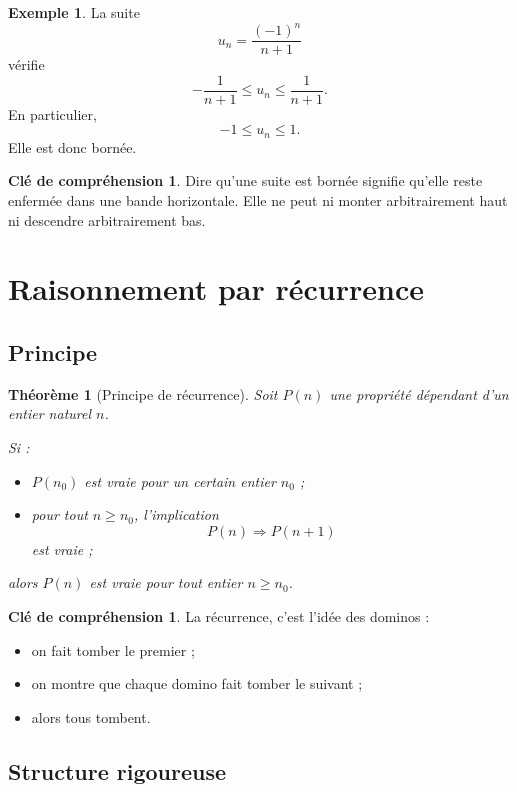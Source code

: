 \documentclass[11pt,a4paper]{article}
\theoremstyle{definition}
\newtheorem{exemple}[definition]{Exemple}
\newtheorem{interpretation}[definition]{Clé de compréhension}
\theoremstyle{plain}
\newtheorem{theoreme}[definition]{Théorème}
\theoremstyle{remark}
\begin{document}
\begin{exemple}
La suite
\[
u_n=\frac{(-1)^n}{n+1}
\]
vérifie
\[
-\frac1{n+1}\leq u_n\leq \frac1{n+1}.
\]
En particulier,
\[
-1\leq u_n\leq 1.
\]
Elle est donc bornée.
\end{exemple}

\begin{interpretation}
Dire qu'une suite est bornée signifie qu'elle reste enfermée dans une bande horizontale. Elle ne peut ni monter arbitrairement haut ni descendre arbitrairement bas.
\end{interpretation}

\section{Raisonnement par récurrence}

\subsection{Principe}

\begin{theoreme}[Principe de récurrence]
Soit $P(n)$ une propriété dépendant d'un entier naturel $n$.

Si :
\begin{itemize}[leftmargin=0.8cm]
    \item $P(n_0)$ est vraie pour un certain entier $n_0$ ;
    \item pour tout $n\geq n_0$, l'implication
    \[
    P(n)\Longrightarrow P(n+1)
    \]
    est vraie ;
\end{itemize}
alors $P(n)$ est vraie pour tout entier $n\geq n_0$.
\end{theoreme}

\begin{interpretation}
La récurrence, c'est l'idée des dominos :
\begin{itemize}[leftmargin=0.8cm]
    \item on fait tomber le premier ;
    \item on montre que chaque domino fait tomber le suivant ;
    \item alors tous tombent.
\end{itemize}
\end{interpretation}

\subsection{Structure rigoureuse}
\end{document}
